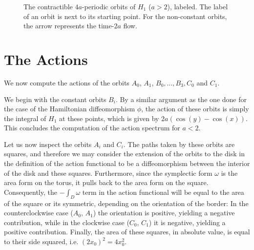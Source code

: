 \begin{figure}
\centering
{}
\caption{The contractible $4a$-periodic orbits of $H_1$ ($a > 2$), labeled. The label of an orbit is next to its starting point. For the non-constant orbits, the arrow represents the time-$2a$ flow.}
\label{orbitsh12}
\end{figure}

\section{The Actions}

We now compute the actions of the orbits $A_0$, $A_1$, $B_0, \dots, B_3, C_0$ and $C_1$.

We begin with the constant orbits $B_i$. By a similar argument as the one done for the case of the Hamiltonian diffeomorphism $\phi$, the action of these orbits is simply the integral of $H_1$ at these points, which is given by $2a(\cos(y) - \cos(x))$. This concludes the computation of the action spectrum for $a < 2$.

Let us now inspect the orbits $A_i$ and $C_i$. The paths taken by these orbits are squares, and therefore we may consider the extension of the orbits to the disk in the definition of the action functional to be a diffeomorphism between the interior of the disk and these squares. Furthermore, since the symplectic form $\omega$ is the area form on the torus, it pulls back to the area form on the square. Consequently, the $- \int_D \omega$ term in the action functional will be equal to the area of the square or its symmetric, depending on the orientation of the border: In the counterclockwise case ($A_0$, $A_1$) the orientation is positive, yielding a negative contribution, while in the clockwise case ($C_0$, $C_1$) it is negative, yielding a positive contribution. Finally, the area of these squares, in absolute value, is equal to their side squared, i.e. $(2x_0)^2 = 4x_0^2$.

